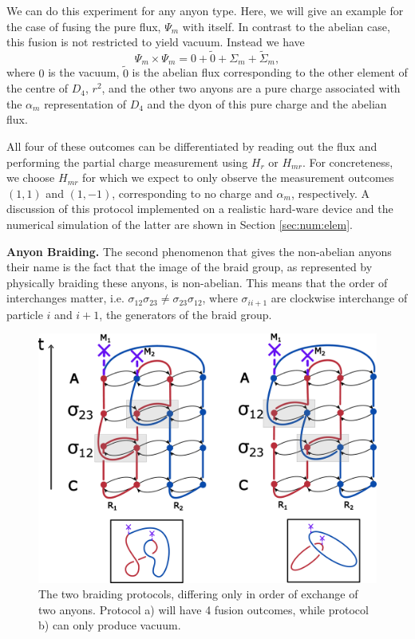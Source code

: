 \documentclass[two column]{article}
\begin{document}
We can do this experiment for any anyon type. Here, we will give an example for the case of fusing the pure flux, $\Psi_m$ with itself. In contrast to the abelian case, this fusion is not restricted to yield vacuum. Instead we have
$$\Psi_m \times \Psi_m = 0 + \tilde{0} + \Sigma_m + \tilde{\Sigma}_m,$$ where $0$ is the vacuum, $\tilde{0}$ is the abelian flux corresponding to the other element of the centre of $D_4$, $r^2$, and the other two anyons are a pure charge associated with the $\alpha_m$ representation of $D_4$ and the dyon of this pure charge and the abelian flux.

All four of these outcomes can be differentiated by reading out the flux and performing the partial charge measurement using $H_r$ or $H_{mr}$. For concreteness, we choose $H_{mr}$ for which we expect to only observe the measurement outcomes $(1,1)$ and $(1,-1)$, corresponding to no charge and $\alpha_m$, respectively. A discussion of this protocol implemented on a realistic hard-ware device and the numerical simulation of the latter are shown in Section \ref{sec:num:elem}.



\textbf{Anyon Braiding.} The second phenomenon that gives the non-abelian anyons their name is the fact that the image of the braid group, as represented by physically braiding these anyons, is non-abelian. 
This means that the order of interchanges matter, i.e. $\sigma_{12}\sigma_{23} \neq \sigma_{23}\sigma_{12}$, where $\sigma_{ii+1}$ are clockwise interchange of particle $i$ and $i+1$, the generators of the braid group.


\begin{figure}
    \centering
    \includegraphics[width=\linewidth]{Figures/fluxBRAID.pdf}
    \caption{The two braiding protocols, differing only in order of exchange of two anyons. Protocol a) will have 4 fusion outcomes, while protocol b) can only produce vacuum.}
    \label{fig:flux_braid}
\end{figure}
\end{document}
